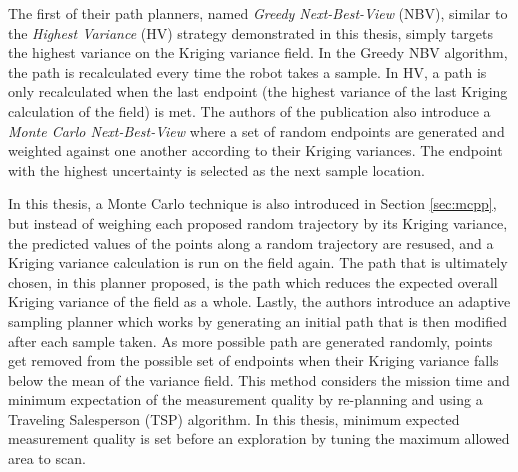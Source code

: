 The first of their path planners, named \textit{Greedy Next-Best-View} (NBV), similar to the \textit{Highest Variance} (HV) strategy demonstrated in this thesis, simply targets the highest variance on the Kriging variance field. In the Greedy NBV algorithm, the path is recalculated every time the robot takes a sample. In HV, a path is only recalculated when the last endpoint (the highest variance of the last Kriging calculation of the field) is met. The authors of the publication also introduce a \textit{Monte Carlo Next-Best-View} where a set of random endpoints are generated and weighted against one another according to their Kriging variances. The endpoint with the highest uncertainty is selected as the next sample location. 

In this thesis, a Monte Carlo technique is also introduced in Section \ref{sec:mcpp}, but instead of weighing each proposed random trajectory by its Kriging variance, the predicted values of the points along a random trajectory are resused, and a Kriging variance calculation is run on the field again. The path that is ultimately chosen, in this planner proposed, is the path which reduces the expected overall Kriging variance of the field as a whole. Lastly, the authors introduce an adaptive sampling planner which works by generating an initial path that is then modified after each sample taken. As more possible path are generated randomly, points get removed from the possible set of endpoints when their Kriging variance falls below the mean of the variance field. This method considers the mission time and minimum expectation of the measurement quality by re-planning and using a Traveling Salesperson (TSP) algorithm. In this thesis, minimum expected measurement quality is set before an exploration by tuning the maximum allowed area to scan.